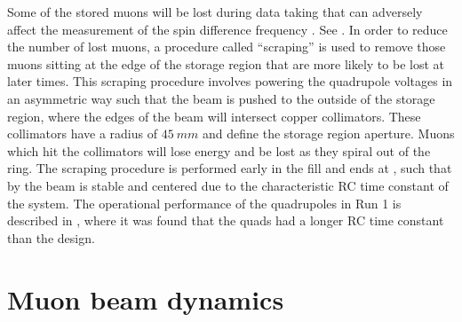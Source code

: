 Some of the stored muons will be lost during data taking that can adversely affect the measurement of the spin difference frequency \wa. See . In order to reduce the number of lost muons, a procedure called ``scraping'' is used to remove those muons sitting at the edge of the storage region that are more likely to be lost at later times. This scraping procedure involves powering the quadrupole voltages in an asymmetric way such that the beam is pushed to the outside of the storage region, where the edges of the beam will intersect copper collimators. These collimators have a radius of $\SI{45}{mm}$ and define the storage region aperture. Muons which hit the collimators will lose energy and be lost as they spiral out of the ring. The scraping procedure is performed early in the fill and ends at , such that by  the beam is stable and centered due to the characteristic RC time constant of the system. The operational performance of the quadrupoles in Run 1 is described in , where it was found that the quads had a longer RC time constant than the design.



\section{Muon beam dynamics}
\label{sec:muonbeamdynamics}

